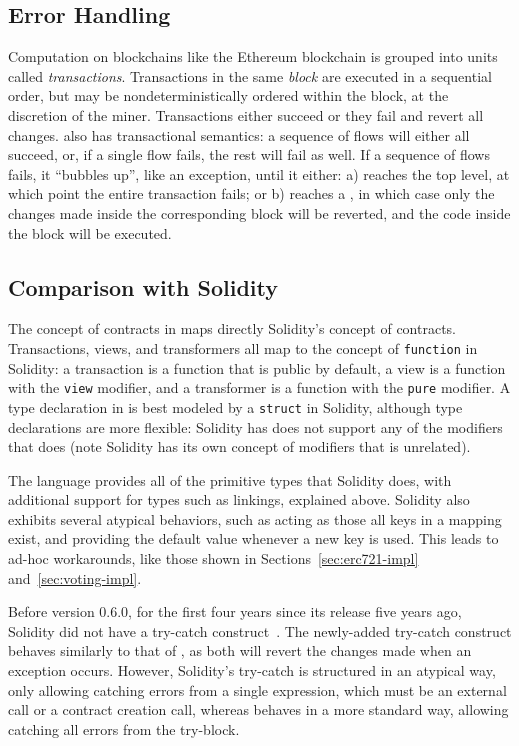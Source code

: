 \documentclass[dvipsnames, usenames, sigconf]{acmart}
\begin{document}
\subsection{Error Handling}
Computation on blockchains like the Ethereum blockchain is grouped into units called \emph{transactions}.
Transactions in the same \emph{block} are executed in a sequential order, but may be nondeterministically ordered within the block, at the discretion of the miner.
Transactions either succeed or they fail and revert all changes.
\langName also has transactional semantics: a sequence of flows will either all succeed, or, if a single flow fails, the rest will fail as well.
If a sequence of flows fails, it ``bubbles up'', like an exception, until it either: a) reaches the top level, at which point the entire transaction fails; or b) reaches a , in which case only the changes made inside the corresponding  block will be reverted, and the code inside the  block will be executed.

\subsection{Comparison with Solidity}
The concept of contracts in \langName maps directly Solidity's concept of contracts.
Transactions, views, and transformers all map to the concept of \lstinline{function} in Solidity: a transaction is a function that is public by default, a view is a function with the \lstinline{view} modifier, and a transformer is a function with the \lstinline{pure} modifier.
A type declaration in \langName is best modeled by a \lstinline{struct} in Solidity, although type declarations are more flexible: Solidity has does not support any of the modifiers that \langName does (note Solidity has its own concept of modifiers that is unrelated).

The \langName language provides all of the primitive types that Solidity does, with additional support for types such as linkings, explained above.
Solidity also exhibits several atypical behaviors, such as acting as those all keys in a mapping exist, and providing the default value whenever a new key is used.
This leads to ad-hoc workarounds, like those shown in Sections~\ref{sec:erc721-impl} and~\ref{sec:voting-impl}.

Before version 0.6.0, for the first four years since its release five years ago, Solidity did not have a try-catch construct~\cite{SolidityTryCatch}.
The newly-added try-catch construct behaves similarly to that of \langName, as both will revert the changes made when an exception occurs.
However, Solidity's try-catch is structured in an atypical way, only allowing catching errors from a single expression, which must be an external call or a contract creation call, whereas \langName behaves in a more standard way, allowing catching all errors from the try-block.
\end{document}
